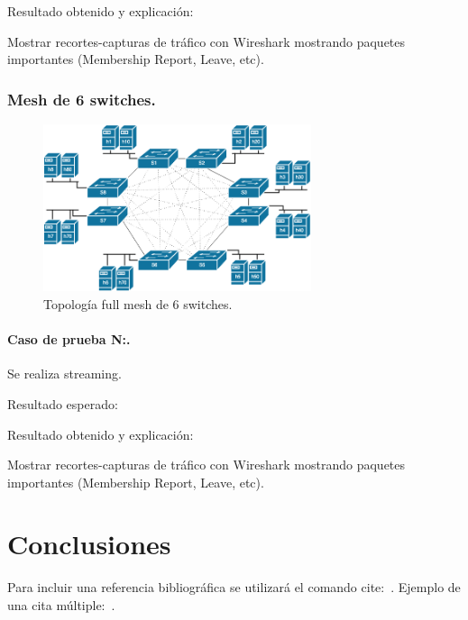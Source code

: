 \documentclass[12pt,a4paper,oneside]{book}
\begin{document}
\vspace{0.5cm}
Resultado obtenido y explicación: 

\vspace{0.5cm}
Mostrar recortes-capturas de tráfico con Wireshark mostrando paquetes importantes (Membership Report, Leave, etc).

\subsection{Mesh de 6 switches.}

\begin{figure}[ht]
 \centering
 \includegraphics[width=0.7\textwidth]{fotos/5_Pruebas/4_topo_mesh/mesh_compleja.png}
 \caption{Topología full mesh de 6 switches.}
 \label{mesh_compleja}
\end{figure}

\subsubsection{Caso de prueba N:.} 
Se realiza streaming.

\vspace{0.5cm}
Resultado esperado: 

\vspace{0.5cm}
Resultado obtenido y explicación: 

\vspace{0.5cm}
Mostrar recortes-capturas de tráfico con Wireshark mostrando paquetes importantes (Membership Report, Leave, etc).


\chapter{Conclusiones}
\label{conclusiones}

Para incluir una referencia bibliográfica se utilizará el comando cite:~\cite{girard1989}.
Ejemplo de una cita múltiple:~\cite{ranta2012,tcs2015}.\\
\end{document}
